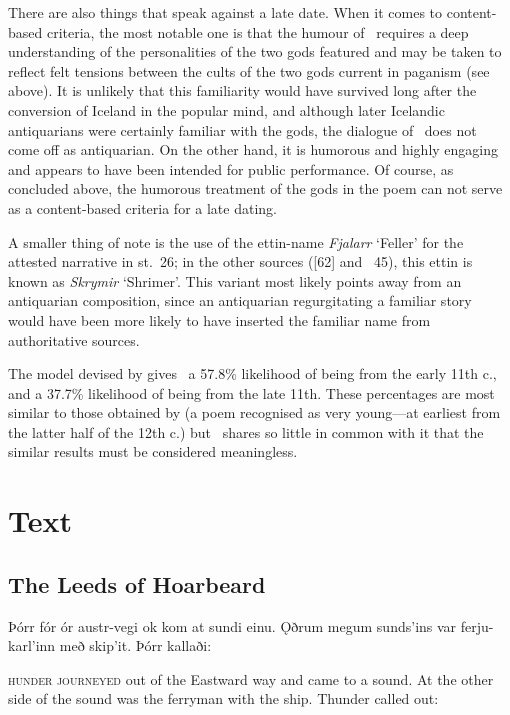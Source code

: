 There are also things that speak against a late date.  When it comes to content-based criteria, the most notable one is that the humour of \Harbardsljod\ requires a deep understanding of the personalities of the two gods featured and may be taken to reflect felt tensions between the cults of the two gods current in paganism (see above).
It is unlikely that this familiarity would have survived long after the conversion of Iceland in the popular mind, and  although later Icelandic antiquarians were certainly familiar with the gods, the dialogue of \Harbardsljod\ does not come off as antiquarian.  On the other hand, it is humorous and highly engaging and appears to have been intended for public performance.  Of course, as concluded above, the humorous treatment of the gods in the poem can not serve as a content-based criteria for a late dating.

A smaller thing of note is the use of the ettin-name \emph{Fjalarr} ‘Feller’ for the attested narrative in st.~26; in the other sources ([62] and \Gylfaginning~45), this ettin is known as \emph{Skrymir} ‘Shrimer’.  This variant most likely points away from an antiquarian composition, since an antiquarian regurgitating a familiar story would have been more likely to have inserted the familiar name from authoritative sources.

The model devised by \textcite{Sapp2022} gives \Harbardsljod\ a 57.8\% likelihood of being from the early 11th c., and a 37.7\% likelihood of being from the late 11th.  These percentages are most similar to those obtained by  (a poem recognised as very young---at earliest from the latter half of the 12th c.) but \Harbardsljod\ shares so little in common with it that the similar results must be considered meaningless.

\newpage

\section{Text}

\subsection{The Leeds of Hoarbeard}

\bpg\bpa{}%
Þórr fór ór austr-vegi ok kom at sundi einu.  Ǫðrum megum sunds’ins var ferju-karl’inn með skip’it. Þórr kallaði:\epa

\textsc{hunder journeyed} out of the Eastward way and came to a sound.  At the other side of the sound was the ferryman with the ship.  Thunder called out:\epb\epg


